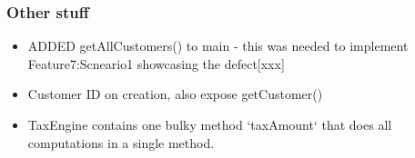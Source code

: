 \subsubsection{Other stuff}

\begin{itemize}

	\item ADDED getAllCustomers() to main - this was needed to implement Feature7:Scneario1 showcasing the defect[xxx]

	 \item Customer ID on creation, also expose getCustomer() 


	 \item TaxEngine contains one bulky method `taxAmount` that does all computations in a single method. 
\end{itemize}


